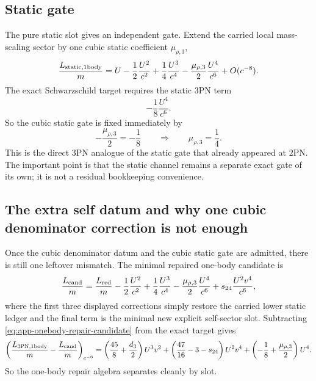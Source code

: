 \documentclass[11pt]{article}
\begin{document}
\subsection{Static gate}
\label{app:onebody-repair-static}

The pure static slot gives an independent gate.  Extend the carried local
mass-scaling sector by one cubic static coefficient $\mu_{\rho,3}$,
\begin{equation}
\frac{L_{\rm static,1body}}{m}
=
U-\frac12\frac{U^2}{c^2}+\frac14\frac{U^3}{c^4}
-\frac{\mu_{\rho,3}}{2}\frac{U^4}{c^6}+O(c^{-8}).
\label{eq:app-onebody-repair-static-sector}
\end{equation}
The exact Schwarzschild target requires the static $3$PN term
\begin{equation}
-\frac18\frac{U^4}{c^6}.
\label{eq:app-onebody-repair-static-target}
\end{equation}
So the cubic static gate is fixed immediately by
\begin{equation}
-\frac{\mu_{\rho,3}}{2}=-\frac18
\qquad\Longrightarrow\qquad
\boxed{\mu_{\rho,3}=\frac14.}
\label{eq:app-onebody-repair-murho3}
\end{equation}
This is the direct $3$PN analogue of the static gate that already appeared at
$2$PN.  The important point is that the static channel remains a separate exact
gate of its own; it is not a residual bookkeeping convenience.

\subsection{The extra self datum and why one cubic denominator correction is not enough}
\label{app:onebody-repair-self}

Once the cubic denominator datum and the cubic static gate are admitted, there
is still one leftover mismatch.  The minimal repaired one-body candidate is
\begin{equation}
\frac{L_{\rm cand}}{m}
=
\frac{L_{\rm red}}{m}
-\frac12\frac{U^2}{c^2}
+\frac14\frac{U^3}{c^4}
-\frac{\mu_{\rho,3}}{2}\frac{U^4}{c^6}
+s_{24}\frac{U^2v^4}{c^6},
\label{eq:app-onebody-repair-candidate}
\end{equation}
where the first three displayed corrections simply restore the carried lower
static ledger and the final term is the minimal new explicit self-sector slot.
Subtracting \eqref{eq:app-onebody-repair-candidate} from the exact target gives
\begin{equation}
\left(\frac{L_{3\mathrm{PN},1\mathrm{body}}}{m}-\frac{L_{\rm cand}}{m}\right)_{c^{-6}}
=
\left(\frac{45}{8}+\frac{d_3}{2}\right)U^3v^2
+\left(\frac{47}{16}-3-s_{24}\right)U^2v^4
+\left(-\frac18+\frac{\mu_{\rho,3}}{2}\right)U^4.
\label{eq:app-onebody-repair-residual}
\end{equation}
So the one-body repair algebra separates cleanly by slot.
\end{document}
